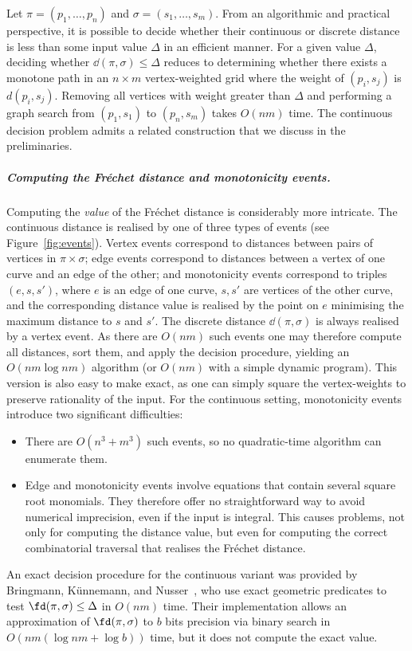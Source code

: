 \documentclass[english, thm-restate, notab]{lipics-v2021}
\begin{document}
Let $\pi = (p_1,\ldots,p_n)$ and $\sigma = (s_1,\ldots,s_m)$. From an algorithmic and practical perspective, it is possible to decide whether their continuous or discrete distance is less than some input value $\Delta$ in an efficient manner. For a given value $\Delta$, deciding whether $\dd(\pi, \sigma) \leq \Delta$ reduces to determining whether there exists a monotone path in an $n \times m$ vertex-weighted grid where the weight of $(p_i, s_j)$ is $d(p_i, s_j)$. Removing all vertices with weight greater than $\Delta$ and performing a graph search from $(p_1, s_1)$ to $(p_n, s_m)$ takes $O(n m)$ time. The continuous decision problem admits a related construction that we discuss in the preliminaries.

\subparagraph{Computing the Fréchet distance and monotonicity events.}
Computing the \emph{value} of the Fréchet distance is considerably more intricate. The continuous distance is realised by one of three types of events (see Figure~\ref{fig:events}). Vertex events correspond to distances between pairs of vertices in $\pi \times \sigma$; edge events correspond to distances between a vertex of one curve and an edge of the other; and monotonicity events correspond to triples $(e, s, s')$, where $e$ is an edge of one curve, $s, s'$ are vertices of the other curve, and the corresponding distance value is realised by  the point on $e$ minimising the maximum distance to $s$ and $s'$. 
The discrete distance $\dd(\pi, \sigma)$ is always realised by a vertex event. As there are $O(nm)$ such events one may therefore compute all distances, sort them, and apply the decision procedure, yielding an $O(n m \log nm)$ algorithm (or $O(n m)$ with a simple dynamic program).
This version is also easy to make exact, as one can simply square the vertex-weights to preserve rationality of the input. 
For the continuous setting, monotonicity events introduce two significant difficulties:
\begin{itemize}
    \item There are $O(n^3 + m^3)$ such events, so no quadratic-time algorithm can enumerate them.
    \item Edge and monotonicity events involve equations that contain several square root monomials. They therefore offer no straightforward way to avoid numerical imprecision, even if the input is integral. This causes problems, not only for computing the distance value, but even for computing the correct combinatorial traversal that realises the Fréchet distance.
\end{itemize}
\noindent
An exact decision procedure for the continuous variant was provided by Bringmann, Künnemann, and Nusser~\cite[SoCG'19]{bringmann2019Walking}, who use exact geometric predicates to test $\fd(\pi, \sigma)\leq \Delta$ in $O(nm )$ time. Their implementation allows an approximation of $\fd(\pi,\sigma)$ to $b$ bits precision via binary search in $O(nm(\log nm + \log b))$ time, but it does not compute the exact value.
\end{document}
